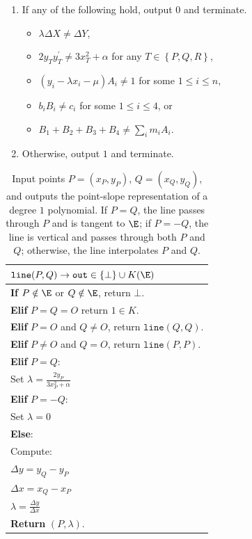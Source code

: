 \documentclass[11pt,letterpaper]{article}
\theoremstyle{definition}
\newcommand{\6}{\mathbf}
\newcommand{\7}{\mathcal}
\begin{document}
\begin{itemize}
\begin{enumerate}
\item  \label{verify4} If any of the following hold, output $0$ and terminate.
\begin{itemize}
\item $\lambda \Delta X \neq \Delta Y$,
\item $2 y_T y_T^\prime \neq 3x_T^2 + \alpha$ for any $T \in \left\{P,Q,R\right\}$,
\item $(y_i - \lambda x_i - \mu)A_i \neq 1$ for some $1 \leq i \leq n$,
\item $b_iB_i \neq c_i$ for some $1 \leq i \leq 4$, or
\item $B_1 + B_2 + B_3 + B_4 \neq \sum_i m_i A_i$.
\end{itemize}
\item  \label{verify5} Otherwise, output $1$ and terminate.

\end{enumerate}

\end{itemize}


\begin{table}[H]
    \centering
    \begin{tabular}{|l|}
    \hline
    $\texttt{line}(P, Q) \to \texttt{out} \in \{\bot\} \cup K(\E)$ \\
    \hline
    \textbf{If} $P \notin \E$ or $Q \notin \E$, return $\bot$. \\
    \textbf{Elif} $P = Q = O$ return $1 \in K$. \\
    \textbf{Elif} $P = O$ and $Q \neq O$, return $\texttt{line}(Q, Q)$. \\
    \textbf{Elif} $P \neq O$ and $Q = O$, return $\texttt{line}(P, P)$. \\
    \textbf{Elif} $P = Q$: \\
    \quad Set $\lambda = \frac{2y_P}{3x_P^2 + \alpha}$ \\
    \textbf{Elif} $P = -Q$: \\
    \quad Set $\lambda = 0$ \\
    \textbf{Else}: \\
    \quad Compute: \\
    \quad\quad $\Delta y = y_Q - y_P$\\
    \quad\quad $\Delta x = x_Q - x_P$\\
    \quad\quad $\lambda = \frac{\Delta y}{\Delta x}$\\
    \textbf{Return} $(P, \lambda)$. \\\hline
    \end{tabular}    
    \caption{
        Input points $P=(x_P,y_P)$, $Q=(x_Q,y_Q)$, and outputs the point-slope representation of a degree $1$ polynomial. If $P = Q$, the line passes through $P$ and is tangent to $\E$; if $P = -Q$, the line is vertical and passes through both $P$ and $Q$; otherwise, the line interpolates $P$ and $Q$. 
    }
    \label{alg:makeline}
\end{table}
\end{document}

